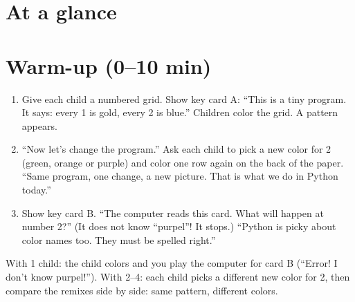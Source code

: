 \section{At a glance}
\begin{timeplan}
\end{timeplan}

\section{Warm-up (0--10 min)}
\begin{unplugged}
\begin{enumerate}[leftmargin=1.4em,itemsep=1pt]
  \item Give each child a numbered grid. Show key card A: \enquote{This is a tiny program. It says: every 1 is gold, every 2 is blue.} Children color the grid. A pattern appears.
  \item \enquote{Now let's change the program.} Ask each child to pick a new color for 2 (green, orange or purple) and color one row again on the back of the paper. \enquote{Same program, one change, a new picture. That is what we do in Python today.}
  \item Show key card B. \enquote{The computer reads this card. What will happen at number 2?} (It does not know \enquote{purpel}! It stops.) \enquote{Python is picky about color names too. They must be spelled right.}
\end{enumerate}
With 1 child: the child colors and you play the computer for card B (\enquote{Error! I don't know purpel!}). With 2--4: each child picks a different new color for 2, then compare the remixes side by side: same pattern, different colors.
\end{unplugged}


